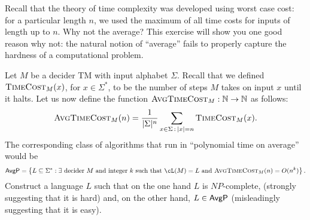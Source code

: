 \begin{problem}
  Recall that the theory of time complexity was developed using
  worst case cost: for a particular length $n$, we used the maximum
  of all time costs for inputs of length up to $n$.
  Why not the average?
  This exercise will show you one good reason why not:
  the natural notion of ``average'' fails to properly capture
  the hardness of a computational problem.
  
  Let $M$ be a decider TM with input alphabet $\Sigma$.
  Recall that we defined $\textsc{TimeCost}_{M}(x)$, for $x \in \Sigma^*$,
  to be the number of steps $M$ takes on input $x$ until it halts.
  Let us now define the function $\textsc{AvgTimeCost}_{M} : \mathbb{N} \to \mathbb{N}$ as follows:
  \[
    \textsc{AvgTimeCost}_{M}(n) = \frac{1}{\lvert\Sigma\rvert^n} \sum_{x \in \Sigma \,:\, \lvert x\rvert = n} \textsc{TimeCost}_{M}(x).
  \]
  The corresponding class of algorithms that run in
  ``polynomial time on average'' would be
  \[
    \AvgP = \set{ L \subseteq \Sigma^* :
    \text{$\exists$ decider $M$ and integer $k$
    such that $\cL(M) = L$ and $\AvgTCost(n) = O(n^k)$} }.
  \]
  Construct a language $L$ such that on the one hand $L$ is $NP$-complete,
  (strongly suggesting that it is hard) and, on the other hand,
  $L \in \textsf{AvgP}$ (misleadingly suggesting that it is easy).
  
  \step
\end{problem}

